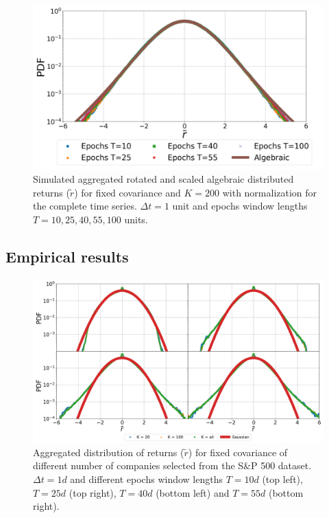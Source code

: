 \begin{figure}[htbp]
    \centering
    \includegraphics[width=0.6\columnwidth]
    {figures/06_epochs_sim_alg_ts_norm.png}
    \caption{Simulated aggregated rotated and scaled algebraic distributed
             returns ($\tilde{r}$) for fixed covariance and $K=200$ with
             normalization for the complete time series. $\Delta t = 1$ unit
             and epochs window lengths $T=10, 25, 40, 55, 100$ units.}
    \label{fig:epochs_alg_agg_ret_pairs_norm_full_ts}
\end{figure}

\subsection{Empirical results}
\label{subsec:emp_results}

\begin{figure}[htbp]
    \centering
    \includegraphics[width=0.8\columnwidth]
    {figures/06_window_comparison.png}
    \caption{Aggregated distribution of returns ($\tilde{r}$) for fixed
             covariance of different number of companies selected from the S\&P
             500 dataset. $\Delta t = 1d$ and different epochs window lengths
             $T=10d$ (top left), $T=25d$ (top right), $T=40d$ (bottom left) and
             $T=55d$ (bottom right).}
    \label{fig:window_comparison_long_norm}
\end{figure}